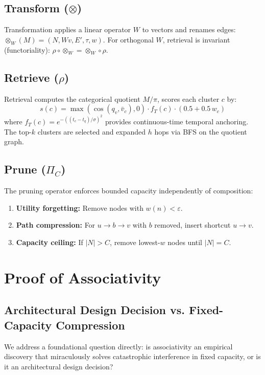 \documentclass[11pt,a4paper]{article}
\theoremstyle{definition}
\begin{document}
\subsection{Transform ($\otimes$)}

Transformation applies a linear operator $W$ to vectors and renames edges: $\otimes_W(M) = (N, Wv, E', \tau, w)$. For orthogonal $W$, retrieval is invariant (functoriality): $\rho \circ \otimes_W = \otimes_W \circ \rho$.

\subsection{Retrieve ($\rho$)}

Retrieval computes the categorical quotient $M/\pi$, scores each cluster $c$ by:
\[
s(c) = \max(\cos(q_v, \bar{v}_c), 0) \cdot f_T(c) \cdot (0.5 + 0.5\, w_c)
\]
where $f_T(c) = e^{-((t_c - t_q)/\sigma)^2}$ provides continuous-time temporal anchoring. The top-$k$ clusters are selected and expanded $h$ hops via BFS on the quotient graph.

\subsection{Prune ($\Pi_C$)}

The pruning operator enforces bounded capacity independently of composition:
\begin{enumerate}
    \item \textbf{Utility forgetting:} Remove nodes with $w(n) < \varepsilon$.
    \item \textbf{Path compression:} For $u \to b \to v$ with $b$ removed, insert shortcut $u \to v$.
    \item \textbf{Capacity ceiling:} If $|N| > C$, remove lowest-$w$ nodes until $|N| = C$.
\end{enumerate}

\section{Proof of Associativity}\label{sec:proofs}

\subsection{Architectural Design Decision vs. Fixed-Capacity Compression}

We address a foundational question directly: is associativity an empirical discovery that miraculously solves catastrophic interference in fixed capacity, or is it an architectural design decision?
\end{document}
